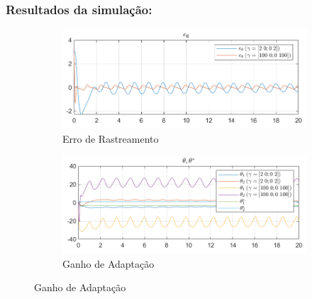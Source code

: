 \documentclass[10pt]{article}
\begin{document}
\subsubsection{Resultados da simulação:}

\begin{figure}[h!]
    \centering
    \begin{subfigure}[b]{0.35\textwidth}
        \centering
        \includegraphics[width=\textwidth]{img/fig04a.png}
        \caption{Erro de Rastreamento}
    \end{subfigure}
    \begin{subfigure}[b]{0.35\textwidth}
        \centering
        \includegraphics[width=\textwidth]{img/fig04b.png}
        \caption{Ganho de Adaptação}
    \end{subfigure}


\end{figure}
\end{document}
